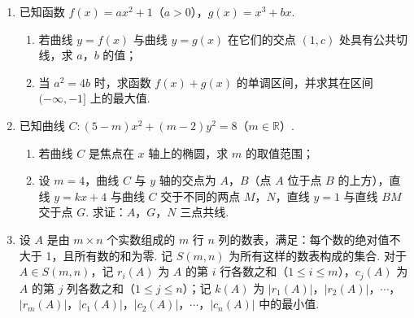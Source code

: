 \begin{description}
\begin{enumerate}[leftmargin=5pt]
\begin{enumerate}
\item 试估计厨余垃圾投放正确的概率；
\item 试估计生活垃圾投放错误的概率；
\item 假设厨余垃圾在“厨余垃圾”箱，“可回收物”箱，“其他垃圾”箱的投放量分别为 \(a\)，\(b\)，\(c\)，其中 \(a>0\)，\(a+b+c=600\). 当数据 \(a\)，\(b\)，\(c\) 的方差 \(s^2\) 最大时，写出 \(a\)，\(b\)，\(c\) 的值（结论不要求证明），并求此时 \(s^2\) 的值.
\end{enumerate}

（注：\(s^2=\frac{1}{n}\left[(x_1-\overline{x})^2+(x_2-\overline{x})^2+\cdots+(x_n-\overline{x})^2\right]\)，其中 \(\overline{x}\) 为数据 \(x_1\)，\(x_2\)，\(\cdots\)，\(x_n\) 的平均数）

        \item 已知函数 \(f(x)=ax^2+1\)（\(a>0\)），\(g(x)=x^3+bx\).

\begin{enumerate}
\item 若曲线 \(y=f(x)\) 与曲线 \(y=g(x)\) 在它们的交点 \((1,c)\) 处具有公共切线，求 \(a\)，\(b\) 的值；
\item 当 \(a^2=4b\) 时，求函数 \(f(x)+g(x)\) 的单调区间，并求其在区间 \((-\infty,-1]\) 上的最大值.
\end{enumerate}

        \item 已知曲线 \(C:(5-m)x^2+(m-2)y^2=8\)（\(m\in\mathbb{R}\)）.

\begin{enumerate}
\item 若曲线 \(C\) 是焦点在 \(x\) 轴上的椭圆，求 \(m\) 的取值范围；
\item 设 \(m=4\)，曲线 \(C\) 与 \(y\) 轴的交点为 \(A\)，\(B\)（点 \(A\) 位于点 \(B\) 的上方），直线 \(y=kx+4\) 与曲线 \(C\) 交于不同的两点 \(M\)，\(N\)，直线 \(y=1\) 与直线 \(BM\) 交于点 \(G\). 求证：\(A\)，\(G\)，\(N\) 三点共线.
\end{enumerate}

        \item 设 \(A\) 是由 \(m\times n\) 个实数组成的 \(m\) 行 \(n\) 列的数表，满足：每个数的绝对值不大于 1，且所有数的和为零. 记 \(S(m,n)\) 为所有这样的数表构成的集合. 对于 \(A\in S(m,n)\)，记 \(r_i(A)\) 为 \(A\) 的第 \(i\) 行各数之和（\(1\le i\le m\)），\(c_j(A)\) 为 \(A\) 的第 \(j\) 列各数之和（\(1\le j\le n\)）；记 \(k(A)\) 为 \(|r_1(A)|\)，\(|r_2(A)|\)，\(\cdots\)，\(|r_m(A)|\)，\(|c_1(A)|\)，\(|c_2(A)|\)，\(\cdots\)，\(|c_n(A)|\) 中的最小值.


\end{enumerate}
\end{description}

